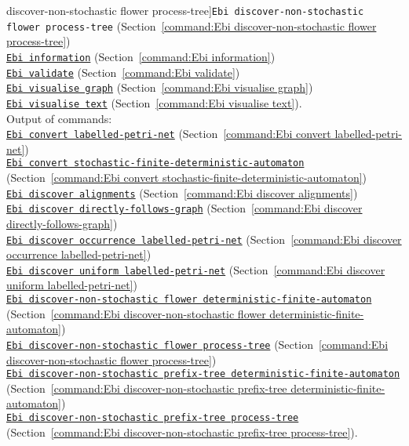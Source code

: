 {discover-non-stochastic flower process-tree]{\texttt{Ebi discover-non-stochastic flower process-tree}} (Section~\ref{command:Ebi discover-non-stochastic flower process-tree})\\\null\qquad\hyperref[command:Ebi information]{\texttt{Ebi information}} (Section~\ref{command:Ebi information})\\\null\qquad\hyperref[command:Ebi validate]{\texttt{Ebi validate}} (Section~\ref{command:Ebi validate})\\\null\qquad\hyperref[command:Ebi visualise graph]{\texttt{Ebi visualise graph}} (Section~\ref{command:Ebi visualise graph})\\\null\qquad\hyperref[command:Ebi visualise text]{\texttt{Ebi visualise text}} (Section~\ref{command:Ebi visualise text}).
\\Output of commands: \\\null\qquad\hyperref[command:Ebi convert labelled-petri-net]{\texttt{Ebi convert labelled-petri-net}} (Section~\ref{command:Ebi convert labelled-petri-net})\\\null\qquad\hyperref[command:Ebi convert stochastic-finite-deterministic-automaton]{\texttt{Ebi convert stochastic-finite-deterministic-automaton}} (Section~\ref{command:Ebi convert stochastic-finite-deterministic-automaton})\\\null\qquad\hyperref[command:Ebi discover alignments]{\texttt{Ebi discover alignments}} (Section~\ref{command:Ebi discover alignments})\\\null\qquad\hyperref[command:Ebi discover directly-follows-graph]{\texttt{Ebi discover directly-follows-graph}} (Section~\ref{command:Ebi discover directly-follows-graph})\\\null\qquad\hyperref[command:Ebi discover occurrence labelled-petri-net]{\texttt{Ebi discover occurrence labelled-petri-net}} (Section~\ref{command:Ebi discover occurrence labelled-petri-net})\\\null\qquad\hyperref[command:Ebi discover uniform labelled-petri-net]{\texttt{Ebi discover uniform labelled-petri-net}} (Section~\ref{command:Ebi discover uniform labelled-petri-net})\\\null\qquad\hyperref[command:Ebi discover-non-stochastic flower deterministic-finite-automaton]{\texttt{Ebi discover-non-stochastic flower deterministic-finite-automaton}} (Section~\ref{command:Ebi discover-non-stochastic flower deterministic-finite-automaton})\\\null\qquad\hyperref[command:Ebi discover-non-stochastic flower process-tree]{\texttt{Ebi discover-non-stochastic flower process-tree}} (Section~\ref{command:Ebi discover-non-stochastic flower process-tree})\\\null\qquad\hyperref[command:Ebi discover-non-stochastic prefix-tree deterministic-finite-automaton]{\texttt{Ebi discover-non-stochastic prefix-tree deterministic-finite-automaton}} (Section~\ref{command:Ebi discover-non-stochastic prefix-tree deterministic-finite-automaton})\\\null\qquad\hyperref[command:Ebi discover-non-stochastic prefix-tree process-tree]{\texttt{Ebi discover-non-stochastic prefix-tree process-tree}} (Section~\ref{command:Ebi discover-non-stochastic prefix-tree process-tree}).
}
